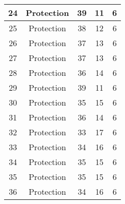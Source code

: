 \documentclass[results.tex]{subfiles}
\begin{document}
\begin{center}
\begin{tabular}{| c || c | c | c | c |}
            \hline
            24                      & Protection                   & 39                     & 11                      & 6                    \\
            \hline
            25                      & Protection                   & 38                     & 12                      & 6                    \\
            \hline
            26                      & Protection                   & 37                     & 13                      & 6                    \\
            \hline
            27                      & Protection                   & 37                     & 13                      & 6                    \\
            \hline
            28                      & Protection                   & 36                     & 14                      & 6                    \\
            \hline
            29                      & Protection                   & 39                     & 11                      & 6                    \\
            \hline
            30                      & Protection                   & 35                     & 15                      & 6                    \\
            \hline
            31                      & Protection                   & 36                     & 14                      & 6                    \\
            \hline
            32                      & Protection                   & 33                     & 17                      & 6                    \\
            \hline
            33                      & Protection                   & 34                     & 16                      & 6                    \\
            \hline
            34                      & Protection                   & 35                     & 15                      & 6                    \\
            \hline
            35                      & Protection                   & 35                     & 15                      & 6                    \\
            \hline
            36                      & Protection                   & 34                     & 16                      & 6                    \\

\end{tabular}
\end{center}
\end{document}
